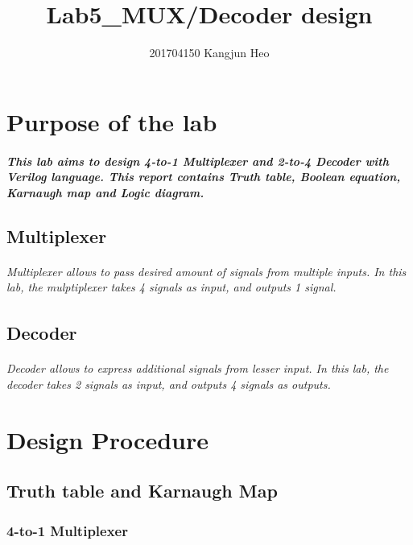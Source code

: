 \documentclass{report}
\title{Lab5\_MUX/Decoder design}
\author{201704150 Kangjun Heo}
\begin{document}
    \maketitle
    \tableofcontents

    \chapter{Purpose of the lab}

        \paragraph{This lab aims to design 4-to-1 Multiplexer and 2-to-4 Decoder with Verilog language. This report contains Truth table, Boolean equation, Karnaugh map and Logic diagram.}
    
        \section{Multiplexer}

        \subparagraph{\normalfont Multiplexer allows to pass desired amount of signals from multiple inputs. In this lab, the mulptiplexer takes 4 signals as input, and outputs 1 signal.}

        \section{Decoder}

        \subparagraph{\normalfont Decoder allows to express additional signals from lesser input. In this lab, the decoder takes 2 signals as input, and outputs 4 signals as outputs.}

    \chapter{Design Procedure}

        \section{Truth table and Karnaugh Map}
            \subsection{4-to-1 Multiplexer}
\end{document}
